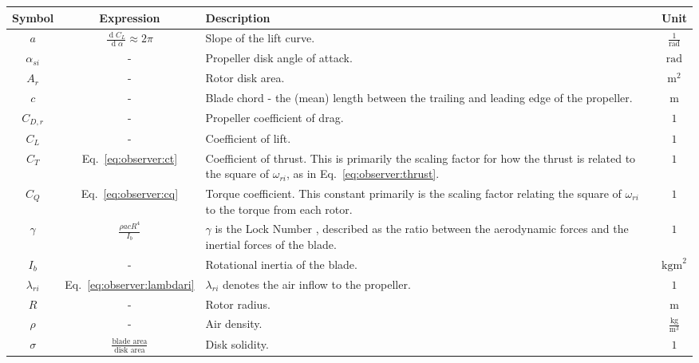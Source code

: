     \begin{table}
        \begin{tabularx}{\tablewidth}{|c|c|X|c|}\hline
            \textbf{Symbol} & \textbf{Expression} & \textbf{Description}  & \textbf{Unit} \\\hline
            $a$ & $\frac{\operatorname{d}\!C_{L}}{\operatorname{d}\!\alpha} \approx 2\pi$ & Slope of the lift curve. & $\frac{1}{\text{rad}}$ \\\hline
            $\alpha_{si}$ & - & Propeller disk angle of attack. & $\text{rad}$ \\\hline
            $A_{r}$ & - & Rotor disk area.   & $\text{m}^{2}$\\\hline
            $c$ & - & Blade chord - the (mean) length between the trailing and leading edge of the propeller.   & $\text{m}$ \\\hline
            $C_{D,r}$ & - & Propeller coefficient of drag. & $1$ \\\hline
            $C_{L}$ & - & Coefficient of lift. & $1$ \\\hline
            $C_{T}$ & Eq.~\eqref{eq:observer:ct} & Coefficient of thrust. This is primarily the scaling factor for how the thrust is related to the square of $\omega_{ri}$, as in Eq.~\eqref{eq:observer:thrust}. & $1$\\\hline
            $C_{Q}$ & Eq.~\eqref{eq:observer:cq} & Torque coefficient. This constant primarily is the scaling factor relating the square of $\omega_{ri}$ to the torque from each rotor. & $1$\\\hline
            $\gamma$ & $\frac{\rho a c R^{4}}{I_{b}}$ & $\gamma$ is the Lock Number \citep{leishman2002principles}, described as the ratio between the aerodynamic forces and the inertial forces of the blade.   & $1$ \\ \hline
            $I_{b}$ & - & Rotational inertia of the blade.  & $\text{kgm}^{2}$\\\hline
            $\lambda_{ri}$ & Eq.~\eqref{eq:observer:lambdari} & $\lambda_{ri}$ denotes the air inflow to the propeller. & $1$ \\\hline
            $R$ & - & Rotor radius.   & $\text{m}$ \\\hline
            $\rho$ & - & Air density.   & $\frac{\text{kg}}{\text{m}^{3}}$ \\\hline
            $\sigma$ & $\frac{\text{blade area}}{\text{disk area}}$ & Disk solidity. & $1$ \\\hline

\end{tabularx}
\end{table}
